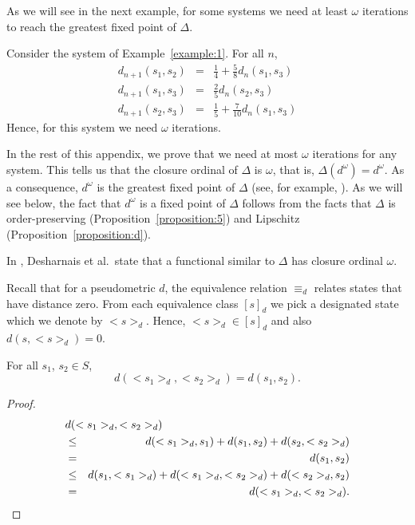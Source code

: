 \documentclass{LMCS}
\begin{document}
As we will see in the next example, for some systems we need at least $\omega$ iterations
to reach the greatest fixed point of $\Delta$.  

\begin{exa}
Consider the system of Example~\ref{example:1}.  For all $n$,
\begin{displaymath}
\begin{array}{rcl}
d_{n+1}(s_1, s_2) & = & \frac{1}{4} + \frac{5}{8} d_n(s_1, s_3)\\
d_{n+1}(s_1, s_3) & = & \frac{2}{5} d_n(s_2, s_3)\\
d_{n+1}(s_2, s_3) & = & \frac{1}{5} + \frac{7}{10} d_n(s_1, s_3)
\end{array}
\end{displaymath}
Hence, for this system we need $\omega$ iterations.
\end{exa}

In the rest of this appendix, we prove that we need at most
$\omega$ iterations for any system.  This tells us that the 
closure ordinal of $\Delta$ is
$\omega$, that is, $\Delta(d^{\omega}) = d^{\omega}$.
As a consequence, $d^{\omega}$ is the greatest fixed point of
$\Delta$ (see, for example, \cite[Example~4.13]{DP90}).  As we will 
see below, the fact that $d^{\omega}$ is a fixed point of $\Delta$ follows
from the facts that $\Delta$ is order-preserving 
(Proposition~\ref{proposition:5}) and Lipschitz 
(Proposition~\ref{proposition:d}).

In \cite[page~418]{DGJP02:lics}, Desharnais et al.\ state that
a functional similar to $\Delta$ has closure ordinal $\omega$.

Recall that for a pseudometric $d$, the equivalence relation $\equiv_d$ 
relates states that have distance zero.  From each equivalence class 
$[s]_d$ we pick a designated state which we denote by $<s>_d$.  
Hence, $<s>_d \in [s]_d$ and also $d(s, <s>_d) = 0$.

\begin{prop}
\label{proposition:a}
For all $s_1$, $s_2 \in S$,
\begin{displaymath}
d(<s_1>_d, <s_2>_d)
=
d(s_1, s_2).
\end{displaymath}
\end{prop}
\begin{proof}
\begin{eqnarray*}
\lefteqn{d(<s_1>_d, <s_2>_d)}\\
& \leq & d(<s_1>_d, s_1) + d(s_1, s_2) + d(s_2, <s_2>_d)\\
& = & d(s_1, s_2)\\
& \leq & d(s_1, <s_1>_d) + d(<s_1>_d, <s_2>_d) + d(<s_2>_d, s_2)\\
& = & d(<s_1>_d, <s_2>_d).
\end{eqnarray*}
\end{proof}
\end{document}
